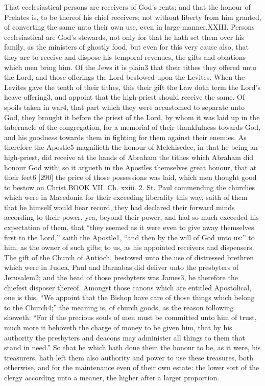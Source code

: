 That ecclesiastical persons are receivers of God’s rents; and that the honour of Prelates is, to be thereof his chief receivers; not without liberty from him granted, of converting the same unto their own use, even in large manner.XXIII. Persons ecclesiastical are God’s stewards, not only for that he hath set them over his family, as the ministers of ghostly food, but even for this very cause also, that they are to receive and dispose his temporal revenues, the gifts and oblations which men bring him. Of the Jews it is plain3 that their tithes they offered unto the Lord, and those offerings the Lord bestowed upon the Levites. When the Levites gave the tenth of their tithes, this their gift the Law doth term the Lord’s heave-offering3, and appoint that the high-priest should receive the same. Of spoils taken in war4, that part which they were accustomed to separate unto God, they brought it before the priest of the Lord, by whom it was laid up in the tabernacle of the congregation, for a memorial of their thankfulness towards God, and his goodness towards them in fighting for them against their enemies. As therefore the Apostle5 magnifieth the honour of Melchisedec, in that he being an high-priest, did receive at the hands of Abraham the tithes which Abraham did honour God with; so it argueth in the Apostles themselves great honour, that at their feet6 [290] the price of those possessions was laid, which men thought good to bestow on Christ.BOOK VII. Ch. xxiii. 2. St. Paul commending the churches which were in Macedonia for their exceeding liberality this way, saith of them that he himself would bear record, they had declared their forward minds according to their power, yea, beyond their power, and had so much exceeded his expectation of them, that “they seemed as it were even to give away themselves first to the Lord,” saith the Apostle1, “and then by the will of God unto us:” to him, as the owner of such gifts; to us, as his appointed receivers and dispensers. The gift of the Church of Antioch, bestowed unto the use of distressed brethren which were in Judea, Paul and Barnabas did deliver unto the presbyters of Jerusalem2; and the head of those presbyters was James3, he therefore the chiefest disposer thereof. Amongst those canons which are entitled Apostolical, one is this, “We appoint that the Bishop have care of those things which belong to the Church4;” the meaning is, of church goods, as the reason following sheweth: “For if the precious souls of men must be committed unto him of trust, much more it behoveth the charge of money to be given him, that by his authority the presbyters and deacons may administer all things to them that stand in need.” So that he which hath done them the honour to be, as it were, his treasurers, hath left them also authority and power to use these treasures, both otherwise, and for the maintenance even of their own estate: the lower sort of the clergy according unto a meaner, the higher after a larger proportion.

